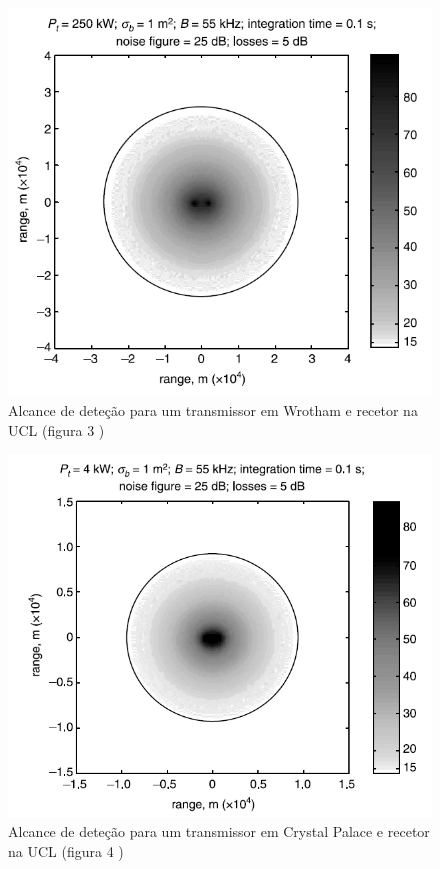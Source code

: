 \begin{figure}[h]
\centering
\includegraphics[scale=0.6]{chapters/ch2/assets/wrotham}
\caption[Alcance de deteção para um transmissor em Wrotham e recetor na \gls{UCL}]{Alcance de deteção para um transmissor em Wrotham e recetor na \gls{UCL} (figura 3 \cite{Griffiths2005})}
\label{fig:wrotham}
\end{figure}

\begin{figure}[h]
\centering
\includegraphics[scale=0.6]{chapters/ch2/assets/cp}
\caption[Alcance de deteção para um transmissor em Crystal Palace e recetor na \gls{UCL}]{Alcance de deteção para um transmissor em Crystal Palace e recetor na \gls{UCL} (figura 4 \cite{Griffiths2005})}
\label{fig:cp}
\end{figure}

